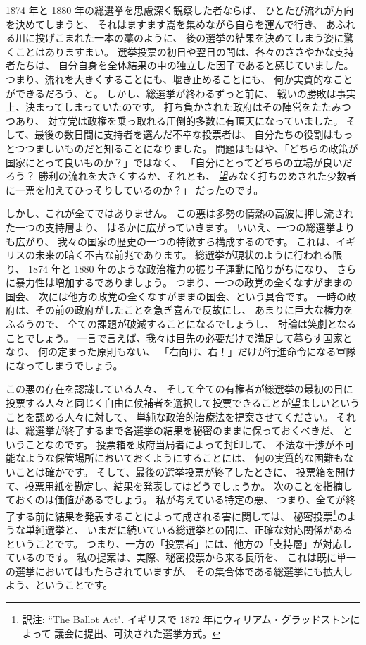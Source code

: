 \documentclass{article}
\begin{document}
 1874 年と 1880 年の総選挙を思慮深く観察した者ならば、
ひとたび流れが方向を決めてしまうと、
それはますます嵩を集めながら自らを運んで行き、
あふれる川に投げこまれた一本の藁のように、
後の選挙の結果を決めてしまう姿に驚くことはありますまい。
選挙投票の初日や翌日の間は、各々のささやかな支持者たちは、
自分自身を全体結果の中の独立した因子であると感じていました。
つまり、流れを大きくすることにも、堰き止めることにも、
何か実質的なことができるだろう、と。
しかし、総選挙が終わるずっと前に、
戦いの勝敗は事実上、決まってしまっていたのです。
打ち負かされた政府はその陣営をたたみつつあり、
対立党は政権を乗っ取れる圧倒的多数に有頂天になっていました。
そして、最後の数日間に支持者を選んだ不幸な投票者は、
自分たちの役割はもっとつつましいものだと知ることになりました。
問題はもはや、「どちらの政策が国家にとって良いものか？」ではなく、
「自分にとってどちらの立場が良いだろう？
勝利の流れを大きくするか、それとも、
望みなく打ちのめされた少数者に一票を加えてひっそりしているのか？」
だったのです。

\medskip

 しかし、これが全てではありません。
この悪は多勢の情熱の高波に押し流された一つの支持層より、
はるかに広がっていきます。
いいえ、一つの総選挙よりも広がり、
我々の国家の歴史の一つの特徴すら構成するのです。
これは、イギリスの未来の暗く不吉な前兆であります。
総選挙が現状のように行われる限り、
1874 年と 1880 年のような政治権力の振り子運動に陥りがちになり、
さらに暴力性は増加するでありましょう。
つまり、一つの政党の全くなすがままの国会、
次には他方の政党の全くなすがままの国会、という具合です。
一時の政府は、その前の政府がしたことを急ぎ喜んで反故にし、
あまりに巨大な権力をふるうので、
全ての課題が破滅することになるでしょうし、
討論は笑劇となることでしょう。
一言で言えば、我々は目先の必要だけで満足して暮らす国家となり、
何の定まった原則もない、
「右向け、右！」だけが行進命令になる軍隊になってしまうでしょう。

\medskip

この悪の存在を認識している人々、
そして全ての有権者が総選挙の最初の日に投票する人々と同じく自由に候補者を選択して投票できることが望ましいということを認める人々に対して、
単純な政治的治療法を提案させてください。
それは、総選挙が終了するまで各選挙の結果を秘密のままに保っておくべきだ、
ということなのです。
投票箱を政府当局者によって封印して、
不法な干渉が不可能なような保管場所においておくようにすることには、
何の実質的な困難もないことは確かです。
そして、最後の選挙投票が終了したときに、
投票箱を開けて、投票用紙を勘定し、結果を発表してはどうでしょうか。
次のことを指摘しておくのは価値があるでしょう。
私が考えている特定の悪、
つまり、全てが終了する前に結果を発表することによって成される害に関しては、
秘密投票\footnote{訳注: ``The Ballot Act".
イギリスで 1872 年にウィリアム・グラッドストンによって
議会に提出、可決された選挙方式。}のような単純選挙と、
いまだに続いている総選挙との間に、正確な対応関係があるということです。
つまり、一方の「投票者」には、他方の「支持層」が対応しているのです。
私の提案は、実際、秘密投票から来る長所を、
これは既に単一の選挙においてはもたらされていますが、
その集合体である総選挙にも拡大しよう、ということです。
\end{document}
